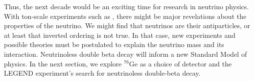 Thus, the next decade would be an exciting time for research in neutrino physics. With ton-scale experiments such as {\Lthou} \cite{legend2017}, there might be major revelations about the properties of the neutrino. We might find that neutrinos are their antiparticles, or at least that inverted ordering is not true. In that case, new experiments and possible theories must be postulated to explain the neutrino mass and its interaction. Neutrinoless double beta decay will inform a new Standard Model of physics. In the next section, we explore ${}^{76}\mathrm{Ge}$ as a choice of detector and the LEGEND experiment's search for neutrinoless double-beta decay.